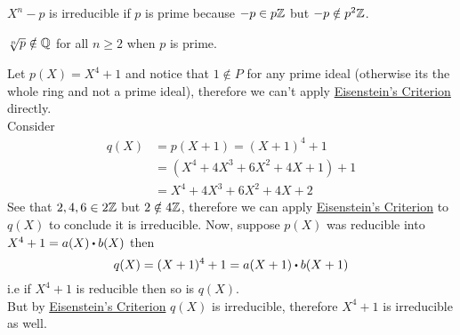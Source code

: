 \documentclass[../Main.tex]{subfiles}
\begin{document}
\begin{example}
	$X^n-p$ is irreducible if $p$ is prime because $-p\in p\mathbb{Z}$ but $-p \notin p^2\mathbb{Z}$.
\end{example}
\begin{crl}[title= $n$th roots of primes are irrational]
	$\sqrt[n]{p}\notin \mathbb{Q}$ for all  $n\ge 2$ when $p$ is prime.
\end{crl}
\begin{example}
	Let $p(X)=X^4+1$ and notice that $1\notin P$ for any prime ideal (otherwise its the whole ring and not a prime ideal), therefore we can't apply \hyperref[thm:eisen]{Eisenstein's Criterion} directly.\\
	Consider
	\begin{align*}
	q(X)&=p(X+1)=(X+1)^4+1\\
	&= (X^4+4X^3+6X^2+4X+1)+1\\
	&= X^4+4X^3+6X^2+4X+2
	\end{align*}
	See that $2,4,6\in 2\mathbb{Z}$ but $2\notin 4\mathbb{Z}$, therefore we can apply \hyperref[thm:eisen]{Eisenstein's Criterion} to $q(X)$ to conclude it is irreducible.
	Now, suppose $p(X)$ was reducible into $X^4+1=a(X)\rdot b(X)$ then 
	\[q(X)=(X+1)^4+1=a(X+1)\rdot b(X+1)\]
	i.e if $X^4+1$ is reducible then so is $q(X)$.\\
	But by \hyperref[thm:eisen]{Eisenstein's Criterion} $q(X)$ is irreducible, therefore $X^4+1$ is irreducible as well.
\end{example}
\end{document}
